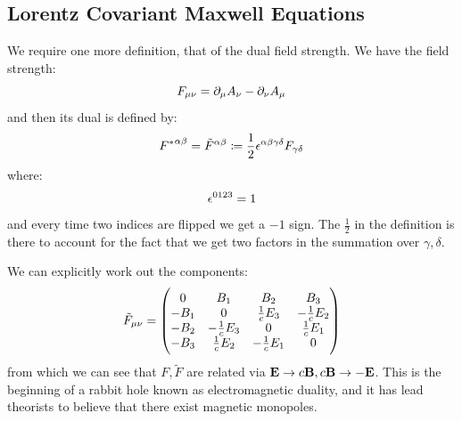 \subsection{Lorentz Covariant Maxwell Equations}
We require one more definition, that of the dual field strength. We have the field strength:
\begin{equation}
    F_{\mu\nu} = \partial_\mu A_\nu - \partial_\nu A_\mu
\end{equation}
and then its dual is defined by:
\begin{equation}
    {F^*}^{\alpha\beta} = \tilde{F}^{\alpha\beta} \coloneqq \frac{1}{2}\epsilon^{\alpha\beta\gamma\delta}F_{\gamma\delta}
\end{equation}
where:
\begin{equation}
    \epsilon^{0123} = 1
\end{equation}
and every time two indices are flipped we get a $-1$ sign. The $\frac{1}{2}$ in the definition is there to account for the fact that we get two factors in the summation over $\gamma, \delta$. 

We can explicitly work out the components:
\begin{equation}
    \tilde{F}_{\mu\nu} = \begin{pmatrix}0 & B_1 & B_2 & B_3 \\ -B_1 & 0 & \frac{1}{c}E_3 & -\frac{1}{c}E_2 \\ -B_2 & -\frac{1}{c}E_3 & 0 & \frac{1}{c}E_1 \\ -B_3 & \frac{1}{c}E_2 & -\frac{1}{c}E_1 & 0\end{pmatrix}
\end{equation}
from which we can see that $F, \tilde{F}$ are related via $\mathbf{E} \to c\mathbf{B}, c\mathbf{B} \to -\mathbf{E}$. This is the beginning of a rabbit hole known as electromagnetic duality, and it has lead theorists to believe that there exist magnetic monopoles.

